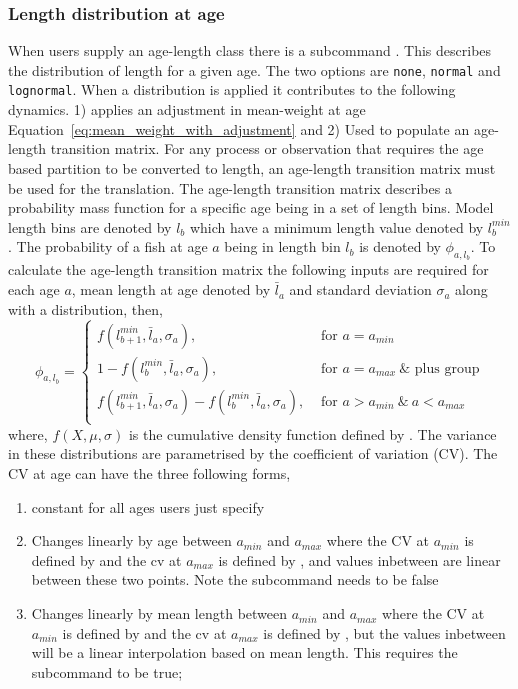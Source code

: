 \subsubsection{Length distribution at age}\label{sec:AgeLength-length_at_age}
When users supply an age-length class there is a subcommand . This describes the distribution of length for a given age. The two options are \texttt{none}, \texttt{normal} and \texttt{lognormal}. When a distribution is applied it contributes to the following dynamics. 1) applies an adjustment in mean-weight at age Equation~\ref{eq:mean_weight_with_adjustment} and 2) Used to populate an age-length transition matrix. For any process or observation that requires the age based partition to be converted to length, an age-length transition matrix must be used for the translation. The age-length transition matrix describes a probability mass function for a specific age being in a set of length bins. Model length bins are denoted by \(l_b\) which have a minimum length value denoted by \(l_b^{min}\). The probability of a fish at age \(a\) being in length bin \(l_b\) is denoted by \(\phi_{a,l_b}\). To calculate the age-length transition matrix the following inputs are required for each age \(a\), mean length at age denoted by \(\bar{l}_a\) and standard deviation \(\sigma_a\) along with a distribution, then,
\begin{equation}
	\phi_{a,l_b} = 
	\begin{cases}
		f(l_{b + 1}^{min},\bar{l}_a, \sigma_a), & \text{ for } a = a_{min}\\
		1 - f(l_{b}^{min},\bar{l}_a, \sigma_a), & \text{ for } a = a_{max} \ \& \text{ plus group}\\
		f(l_{b+1}^{min},\bar{l}_a, \sigma_a) - f(l_{b}^{min},\bar{l}_a, \sigma_a), & \text{ for } a > a_{min} \ \& \ a < a_{max} \\				
	\end{cases}
\end{equation}
%
where, \(f(X,\mu, \sigma)\) is the cumulative density function defined by . The variance in these distributions are parametrised by the coefficient of variation (CV). The CV at age can have the three following forms,
\begin{enumerate}
	\item constant for all ages users just specify \\
	\item Changes linearly by age between \(a_{min}\) and \(a_{max}\) where the CV at \(a_{min}\) is defined by  and the cv at \(a_{max}\) is defined by , and values inbetween are linear between these two points. Note the subcommand  needs to be false
	\item Changes linearly by mean length between \(a_{min}\) and \(a_{max}\) where the CV at \(a_{min}\) is defined by  and the cv at \(a_{max}\) is defined by , but the values inbetween will be a linear interpolation based on mean length. This requires the subcommand  to be true;
\end{enumerate}

